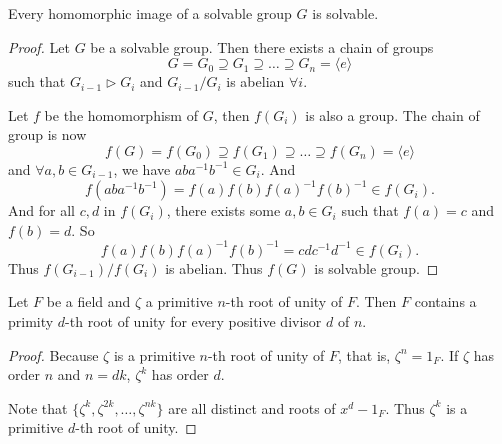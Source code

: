 \begin{theorem}
    Every homomorphic image of a solvable group $G$ is solvable.
\end{theorem}
\begin{proof}
    Let $G$ be a solvable group. Then there exists a chain of groups
    \[
        G = G_0 \supseteq G_1 \supseteq \ldots \supseteq G_n = \langle  e \rangle
    \]
    such that $G_{i-1} \triangleright G_i$ and $G_{i-1} / G_i$ is abelian $\forall i$.

    Let $f$ be the homomorphism of $G$, then $f(G_i)$ is also a group. The chain of group is now 
    \[
        f(G) = f(G_0) \supseteq f(G_1) \supseteq \ldots \supseteq f(G_n) = \langle  e \rangle
    \]
    and $\forall a, b \in G_{i-1}$, we have $aba^{-1}b^{-1} \in G_i$. And 
    \[
        f(aba^{-1}b^{-1}) = f(a)f(b)f(a)^{-1}f(b)^{-1} \in f(G_i).
    \]
    And for all $c, d$ in $f(G_i)$, there exists some $a, b \in G_i$ such that $f(a) = c$ and 
    $f(b) = d$. So 
    \[
        f(a)f(b)f(a)^{-1}f(b)^{-1} = cdc^{-1}d^{-1} \in f(G_i).
    \]
    Thus $f(G_{i-1})/f(G_i)$ is abelian. Thus $f(G)$ is solvable group.
\end{proof}

\begin{lemma}
    Let $F$ be a field and $\zeta$ a primitive $n$-th root of unity of $F$. Then $F$ contains a primity $d$-th root of unity 
    for every positive divisor $d$ of $n$.
\end{lemma}
\begin{proof}
    Because $\zeta$ is a primitive $n$-th root of unity of $F$, that is, $\zeta^n = 1_F$. If $\zeta$ 
    has order $n$ and $n = dk$, $\zeta^k$ has order $d$.

    Note that $\{ \zeta^k, \zeta^{2k}, \ldots, \zeta^{nk} \}$ are all distinct and roots of $x^d - 1_F$. Thus 
    $\zeta^k$ is a primitive $d$-th root of unity.
\end{proof}

